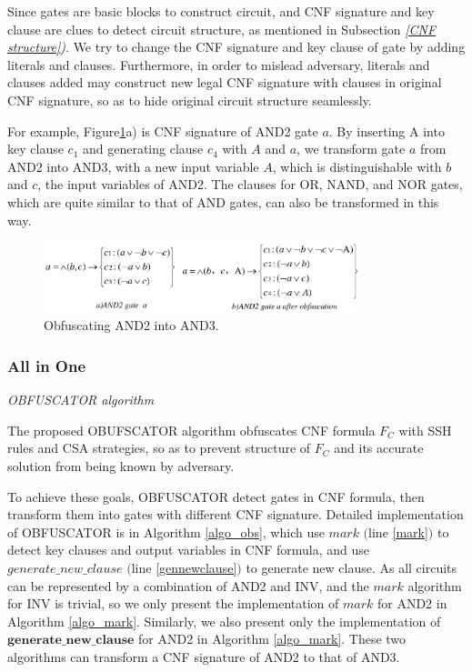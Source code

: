 \documentclass[conference]{IEEEtran}
\begin{document}
Since gates are basic blocks to construct circuit, 
and CNF signature and key clause are clues to detect circuit structure, 
as mentioned in Subsection \textit{\ref{CNF structure})}.
We try to change the CNF signature and key clause of gate by adding literals and clauses.
Furthermore, in order to mislead adversary, 
literals and clauses added may construct new legal CNF signature with clauses in original CNF signature, 
so as to hide original circuit structure seamlessly.

For example, Figure\ref{fig_AND2}a) is CNF signature of AND2 gate $a$.
By inserting A into key clause $c_1$ and generating clause $c_4$ with $A$ and $a$, 
we transform gate $a$ from AND2 into AND3, with a new input variable $A$, 
which is distinguishable with $b$ and $c$, the input variables of AND2.
The clauses for OR, NAND, and NOR gates, 
which are quite similar to that of AND gates,
can also be transformed in this way. 

\begin{figure}
\footnotesize\centering
\centerline{\includegraphics[width=9.2cm]{AND2.eps}}
\caption{Obfuscating AND2 into AND3.}\centering
\label{fig_AND2}
\end{figure}

\subsubsection{All in One}\textsl{OBFUSCATOR algorithm}

The proposed OBUFSCATOR algorithm obfuscates CNF formula $F_C$ with SSH rules and CSA strategies, 
so as to prevent structure of $F_C$ and its accurate solution from being known by adversary.

To achieve these goals, OBFUSCATOR detect gates in CNF formula, 
then transform them into gates with different CNF signature.
Detailed implementation of OBFUSCATOR is in Algorithm \ref{algo_obs}, which use $mark$ $($line \ref{mark}$)$ to detect key clauses and output variables  in CNF formula, 
and use $generate\_new\_clause$ $($line \ref{gennewclause}$)$ to generate new clause.
As all circuits can be represented by a combination of AND2 and INV, 
and the $mark$ algorithm for INV is trivial, 
so we only present the implementation of $mark$ for AND2 in Algorithm \ref{algo_mark}.
Similarly, we also present only the implementation of $\mathbf{generate\_new\_clause}$ for AND2 in Algorithm \ref{algo_mark}.
These two algorithms can transform a CNF signature of AND2 to that of AND3.
\end{document}
